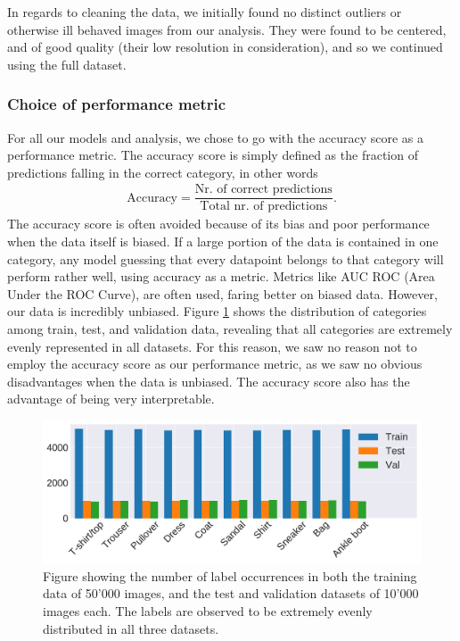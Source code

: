 \documentclass[10pt, twocolumn]{article}
\begin{document}

In regards to cleaning the data, we initially found no distinct outliers or otherwise ill behaved images from our analysis. They were found to be centered, and of good quality (their low resolution in consideration), and so we continued using the full dataset.

\subsubsection{Choice of performance metric}
For all our models and analysis, we chose to go with the accuracy score as a performance metric. The accuracy score is simply defined as the fraction of predictions falling in the correct category, in other words
\begin{align}
    \text{Accuracy} = \dfrac{\text{Nr. of correct predictions}}{\text{Total nr. of predictions}}.
\end{align}
The accuracy score is often avoided because of its bias and poor performance when the data itself is biased. If a large portion of the data is contained in one category, any model guessing that every datapoint belongs to that category will perform rather well, using accuracy as a metric. Metrics like AUC ROC (Area Under the ROC Curve), are often used, faring better on biased data. However, our data is incredibly unbiased. Figure \ref{fig:label_dist} shows the distribution of categories among train, test, and validation data, revealing that all categories are extremely evenly represented in all datasets. For this reason, we saw no reason not to employ the accuracy score as our performance metric, as we saw no obvious disadvantages when the data is unbiased. The accuracy score also has the advantage of being very interpretable.


\begin{figure}[H]
    \centering
    \includegraphics[scale=0.4]{../figs/label_distribution.pdf}
    \caption{Figure showing the number of label occurrences in both the training data of 50'000 images, and the test and validation datasets of 10'000 images each. The labels are observed to be extremely evenly distributed in all three datasets.}
    \label{fig:label_dist}
\end{figure}
\end{document}
